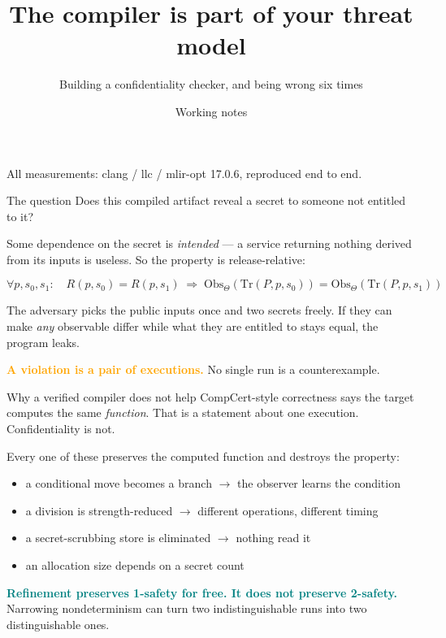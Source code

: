 \documentclass[aspectratio=169,10pt]{beamer}
\title{The compiler is part of your threat model}
\subtitle{Building a confidentiality checker, and being wrong six times}
\author{Working notes}
\date{}
\newcommand{\good}[1]{\textcolor{Teal}{\textbf{#1}}}
\newcommand{\bad}[1]{\textcolor{Orange}{\textbf{#1}}}
\newcommand{\vs}{\textcolor{Muted}{$\rightarrow$}}
\begin{document}
\begin{frame}[plain]
  \titlepage
  \begin{center}
  \small\color{Muted}
  All measurements: clang / llc / mlir-opt 17.0.6, reproduced end to end.
  \end{center}
\end{frame}

\begin{frame}{The question}
  Does this compiled artifact reveal a secret to someone not entitled to it?

  \vspace{1em}
  Some dependence on the secret is \emph{intended} --- a service returning nothing
  derived from its inputs is useless. So the property is release-relative:

  \begin{block}{}
  \[
    \forall p,s_0,s_1:\quad R(p,s_0)=R(p,s_1)\;\Longrightarrow\;
    \mathrm{Obs}_\Theta(\mathrm{Tr}(P,p,s_0))=\mathrm{Obs}_\Theta(\mathrm{Tr}(P,p,s_1))
  \]
  \end{block}

  \vspace{0.5em}
  The adversary picks the public inputs once and two secrets freely. If they can
  make \emph{any} observable differ while what they are entitled to stays equal,
  the program leaks.

  \vspace{0.5em}
  \bad{A violation is a pair of executions.} No single run is a counterexample.
\end{frame}

\begin{frame}{Why a verified compiler does not help}
  CompCert-style correctness says the target computes the same \emph{function}.
  That is a statement about one execution. Confidentiality is not.

  \vspace{0.8em}
  Every one of these preserves the computed function and destroys the property:
  \begin{itemize}
    \item a conditional move becomes a branch \vs{} the observer learns the condition
    \item a division is strength-reduced \vs{} different operations, different timing
    \item a secret-scrubbing store is eliminated \vs{} nothing read it
    \item an allocation size depends on a secret count
  \end{itemize}

  \vspace{0.8em}
  \good{Refinement preserves 1-safety for free. It does not preserve 2-safety.}
  Narrowing nondeterminism can turn two indistinguishable runs into two
  distinguishable ones.
\end{frame}
\end{document}
